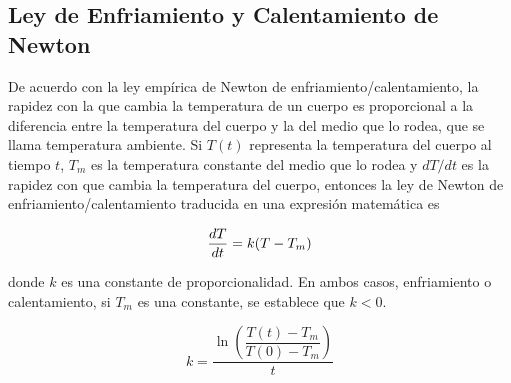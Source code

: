 \subsection{Ley de Enfriamiento y Calentamiento de Newton}

De acuerdo con la ley empírica de Newton de enfriamiento/calentamiento, la rapidez con la que cambia la temperatura de un cuerpo es proporcional
a la diferencia entre la temperatura del cuerpo y la del medio que lo rodea, que se llama temperatura ambiente. Si $T(t)$ representa la 
temperatura del cuerpo al tiempo $t$, $T_m$ es la temperatura constante del medio que lo rodea y $dT/dt$ es la rapidez con que cambia la 
temperatura del cuerpo, entonces la ley de Newton de enfriamiento/calentamiento traducida en una expresión matemática es 

\begin{equation}
	{dT\over dt} = k(T-T_m)
	\label{eq:leyEnfCalNewton}
\end{equation}

donde $k$ es una constante de proporcionalidad. En ambos casos, enfriamiento o calentamiento, si $T_m$ es una constante, se establece que $k<0$.

\begin{equation}
	k = \frac{\ln \left( \dfrac{T(t)-T_m}{T(0)-T_m} \right)}{t}
	\label{eq:constanteLECNewton}
\end{equation}

